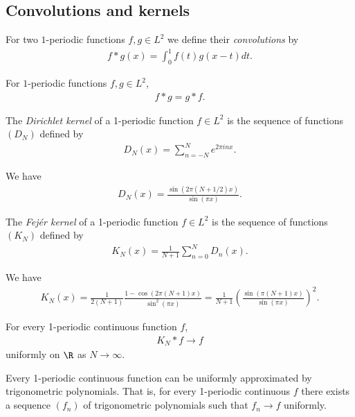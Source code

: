 \documentclass{article}
\begin{document}
\subsection{Convolutions and kernels}

\begin{definition}
	For two $1$-periodic functions $f,g\in L^2$ we define their \emph{convolutions}
	by
	\begin{align*}
		f*g(x)=\int_0^1 f(t)g(x-t)dt.
	\end{align*}
\end{definition}

\begin{lemma}[Notes 5.2]
	For $1$-periodic functions $f,g\in L^2$,
	\begin{align*}
		f*g=g*f.
	\end{align*}
\end{lemma}

\begin{definition}
	The \emph{Dirichlet kernel} of a 1-periodic function $f\in L^2$ is the sequence of functions
	$(D_N)$ defined by
	\begin{align*}
		D_N(x)=\sum_{n=-N}^N e^{2\pi inx}.
	\end{align*}
\end{definition}

\begin{lemma}[Notes 5.3]
	We have
	\begin{align*}
		D_N(x)=\frac{\sin(2\pi(N+1/2)x)}{\sin(\pi x)}.
	\end{align*}
\end{lemma}

\begin{definition}
	The \emph{Fej\'er kernel} of a 1-periodic function $f\in L^2$ is the sequence of functions
	$(K_N)$ defined by
	\begin{align*}
		K_N(x)=\frac{1}{N+1}\sum_{n=0}^ND_n(x).
	\end{align*}
\end{definition}

\begin{lemma}[Notes 5.4]
	We have
	\begin{align*}
		K_N(x)=\frac{1}{2(N+1)}\frac{1-\cos(2\pi(N+1)x)}{\sin^2(\pi x)}
		=\frac{1}{N+1}\left(\frac{\sin(\pi(N+1)x)}{\sin(\pi x)}\right)^2.
	\end{align*}
\end{lemma}

\begin{theorem}[Fej\'er]
	For every 1-periodic continuous function $f$,
	\begin{align*}
		K_N*f\to f
	\end{align*}
	uniformly on $\R$ as $N\to \infty$.
\end{theorem}

\begin{corollary*}
	Every 1-periodic continuous function can be uniformly approximated by trigonometric
	polynomials. That is, for every 1-periodic continuous $f$ there exists a sequence
	$(f_n)$ of trigonometric polynomials such that $f_n\to f$ uniformly.
\end{corollary*}
\end{document}
